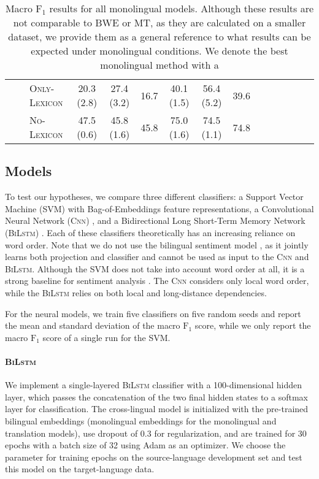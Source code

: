 \documentclass[a4paper,11pt,twocolumn,twoside]{article}
\newcommand{\onlylex}{\textsc{Only-Lexicon}\xspace}
\newcommand{\nolex}{\textsc{No-Lexicon}\xspace}
\newcommand{\bilstm}{\textsc{BiLstm}\xspace}
\newcommand{\cnn}{\textsc{Cnn}\xspace}
\newcommand{\F}{$\text{F}_1$\xspace}
\begin{document}
\begin{table*}[th!]
\begin{tabular}{lllcccccccccccc}
		&& \onlylex  & 20.3 \scriptsize{(2.8)} & 27.4 \scriptsize{(3.2)}  & 16.7  & 40.1 \scriptsize{(1.5)} & 56.4 \scriptsize{(5.2)} & 39.6  \\ 
		&& \nolex    & 47.5 \scriptsize{(0.6)} & 45.8 \scriptsize{(1.6)}  & 45.8  & 75.0 \scriptsize{(1.6)} & 74.5 \scriptsize{(1.1)} & 74.8  \\ 
\bottomrule
\end{tabular}
\caption{Macro \F results for all  monolingual models. Although these results are not comparable to BWE or MT, as they are calculated on a smaller dataset, we provide them as a general reference to what results can be expected under monolingual conditions. We denote the best monolingual method
  with a }
\label{results:mono}
\end{table*}



\subsection{Models}

To test our hypotheses, we compare three different classifiers: a Support Vector Machine (SVM) with Bag-of-Embeddings feature representations, a Convolutional Neural Network (\cnn) \cite{Santos2014,Severyn2015}, and a Bidirectional Long Short-Term Memory Network (\bilstm) \cite{Luong2015}. Each of these classifiers theoretically has an increasing reliance on word order. Note that we do not use the bilingual sentiment model \cite{Barnes2018b}, as it jointly learns both projection and classifier and cannot be used as input to the \cnn and \bilstm. Although the SVM does not take into account word order at all, it is a strong baseline for sentiment analysis \cite{Kiritchenko2014c}. The \cnn considers only local word order, while the \bilstm relies on both local and long-distance dependencies. 

For the neural models, we train five classifiers on five random seeds and report the mean and standard deviation of the macro \F score, while we only report the macro \F score of a single run for the SVM.

\paragraph{\bilstm} We implement a single-layered \bilstm classifier with a 100-dimensional hidden layer, which passes the concatenation of the two final hidden states to a softmax layer for classification. The cross-lingual model is initialized with the pre-trained bilingual embeddings (monolingual embeddings for the monolingual and translation models), use dropout of $0.3$ for regularization, and are trained for 30 epochs with a batch size of 32 using Adam as an optimizer. We choose the parameter for training epochs on the source-language development set and test this model on the target-language data.
\end{document}
